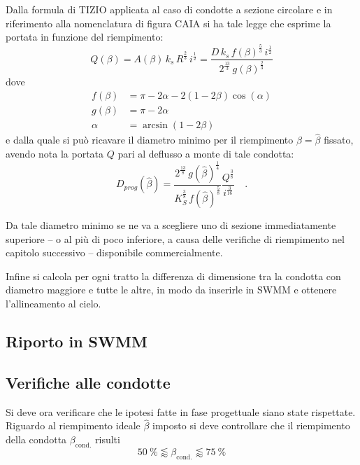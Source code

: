 Dalla formula di TIZIO applicata al caso di condotte a sezione circolare e in riferimento alla nomenclatura di figura CAIA si ha tale legge che esprime la portata in funzione del riempimento:
\begin{equation}
    Q(\beta) 
    = A(\beta) \, k_s \, R^{\tfrac{2}{3}} \, i^{\tfrac{1}{2}} 
    = \frac{ D \, k_s \, f(\beta)^{\tfrac{5}{3}} \, i^{\tfrac{1}{2}} }{ 2^{\tfrac{13}{3}} \, g(\beta)^{\tfrac{2}{3}} }
\end{equation}
dove 
\begin{align}
    f(\beta) &= \pi - 2 \alpha - 2 (1 - 2 \beta) \cos(\alpha) \\
    g(\beta) &= \pi - 2 \alpha \\
    \alpha &= \arcsin(1 - 2 \beta)
\end{align}
e dalla quale si può ricavare il diametro minimo per il riempimento $\beta = \hat{\beta}$ fissato, avendo nota la portata $Q$ pari al deflusso a monte di tale condotta:
\begin{equation}
    D_{prog}(\hat{\beta}) = \frac{ 2^{\tfrac{13}{8}} \, g(\hat{\beta})^{\tfrac{1}{4}} }{     K_S^{\tfrac{3}{8}} \, f(\hat{\beta})^{\tfrac{5}{8}} } \frac{Q^{\tfrac{3}{8}}}{i^{\tfrac{3}{16}}} \quad .
\end{equation} 

Da tale diametro minimo se ne va a scegliere uno di sezione immediatamente superiore -- o al più di poco inferiore, a causa delle verifiche di riempimento nel capitolo successivo -- disponibile commercialmente.

Infine si calcola per ogni tratto la differenza di dimensione tra la condotta con diametro maggiore e tutte le altre, in modo da inserirle in SWMM e ottenere l'allineamento al cielo.

\subsection{Riporto in SWMM}
\subsection{Verifiche alle condotte}
Si deve ora verificare che le ipotesi fatte in fase progettuale siano state rispettate. 
Riguardo al riempimento ideale $\hat \beta$ imposto si deve controllare che il riempimento della condotta $\beta_\text{cond.}$ risulti 
\begin{equation}
    \SI{50}{\percent} \lessapprox \beta_\text{cond.} \lessapprox\SI{75}{\percent}
\end{equation}

